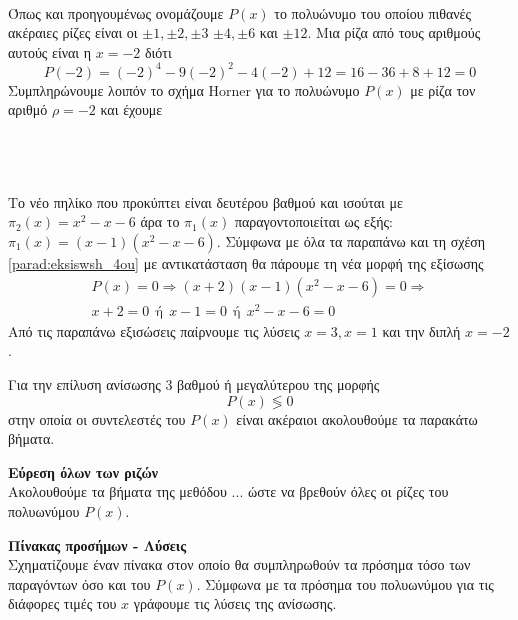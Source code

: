 \lysh\\
Όπως και προηγουμένως ονομάζουμε $ P(x) $ το πολυώνυμο του οποίου πιθανές ακέραιες ρίζες είναι οι $ \pm1, \pm 2,\pm 3$  $\pm4, \pm6 $ και $ \pm12 $. Μια ρίζα από τους αριθμούς αυτούς είναι η $ x=-2 $ διότι
\[ P(-2)=(-2)^4-9(-2)^2-4(-2)+12=16-36+8+12=0 \]
Συμπληρώνουμε λοιπόν το σχήμα Horner για το πολυώνυμο $ P(x) $ με ρίζα τον αριθμό $ \rho=-2 $  και έχουμε
\begin{center}
\end{center}
\\\\\\
Το νέο πηλίκο που προκύπτει είναι δευτέρου βαθμού και ισούται με $ \pi_2(x)=x^2-x-6 $ άρα το $ \pi_1(x) $ παραγοντοποιείται ως εξής: $ \pi_1(x)=(x-1)\left( x^2-x-6\right)  $. Σύμφωνα με όλα τα παραπάνω και τη σχέση \eqref{parad:eksiswsh_4ou} με αντικατάσταση θα πάρουμε τη νέα μορφή της εξίσωσης
\begin{gather*}
P(x)=0\Rightarrow(x+2)(x-1)\left( x^2-x-6\right)=0\Rightarrow\\
x+2=0\ \ \textrm{ή}\ \ x-1=0\ \ \textrm{ή}\ \ x^2-x-6=0
\end{gather*}
Από τις παραπάνω εξισώσεις παίρνουμε τις λύσεις $ x=3,x=1 $ και την διπλή $ x=-2 $.
\begin{Methodos}{9cm}
Για την επίλυση ανίσωσης 3 βαθμού ή μεγαλύτερου της μορφής
\[ P(x)\lessgtr 0 \]
στην οποία οι συντελεστές του $ P(x) $ είναι ακέραιοι ακολουθούμε τα παρακάτω βήματα.
\begin{bhma}
\item\textbf{Εύρεση όλων των ριζών}\\
Ακολουθούμε τα βήματα της μεθόδου ... ώστε να βρεθούν όλες οι ρίζες του πολυωνύμου $ P(x) $.
\item \textbf{Πίνακας προσήμων - Λύσεις}\\
Σχηματίζουμε έναν πίνακα στον οποίο θα συμπληρωθούν τα πρόσημα τόσο των παραγόντων όσο και του $ P(x) $. Σύμφωνα με τα πρόσημα του πολυωνύμου για τις διάφορες τιμές του $ x $ γράφουμε τις λύσεις της ανίσωσης. 	
\end{bhma}
\end{Methodos}
